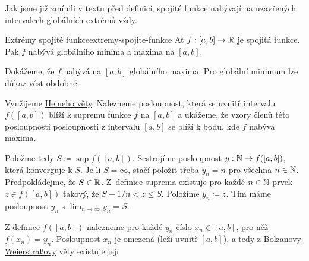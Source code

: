 Jak jsme již zmínili v textu před definicí, spojité funkce nabývají na
uzavřených intervalech globálních extrémů vždy.

\begin{theorem}{Extrémy spojité funkce}{extremy-spojite-funkce}
 Ať $f:[a,b] \to \mathbb{R}$ je spojitá funkce. Pak $f$ nabývá globálního minima a
 maxima na $[a,b]$.
\end{theorem}
\begin{thmproof}
 Dokážeme, že $f$ nabývá na $[a,b]$ globálního maxima. Pro globální minimum lze
 důkaz vést obdobně.

 Využijeme \hyperref[thm:heineho]{Heineho věty}. Nalezneme posloupnost, která se
 uvnitř intervalu $f([a,b])$ blíží k supremu funkce $f$ na $[a,b]$ a ukážeme, že
 vzory členů této posloupnosti posloupnosti z intervalu $[a,b]$ se blíží k bodu,
 kde $f$ nabývá maxima.

 Položme tedy $S \coloneqq \sup f([a,b])$. Sestrojíme posloupnost $y: \mathbb{N} \to
 f([a,b])$, která konverguje k $S$. Je-li $S=\infty$, stačí položit třeba $y_n =
 n$ pro všechna $n \in \mathbb{N}$. Předpokládejme, že $S \in \mathbb{R}$. Z~definice suprema
 existuje pro každé $n \in \mathbb{N}$ prvek $z \in f([a,b])$ takový, že $S-1 / n < z
 \leq S$. Položíme $y_n \coloneqq z$. Tím máme posloupnost $y_n$ s $\lim_{n \to
 \infty} y_n = S$.

 Z definice $f([a,b])$ nalezneme pro každé $y_n$ číslo $x_n \in [a,b]$, pro něž
 $f(x_n) = y_n$. Posloupnost $x_n$ je omezená (leží uvnitř $[a,b]$), a tedy z
 \hyperref[thm:bolzano-weierstrass]{Bolzanovy-Weierstraßovy} věty existuje její
 
\end{thmproof}
